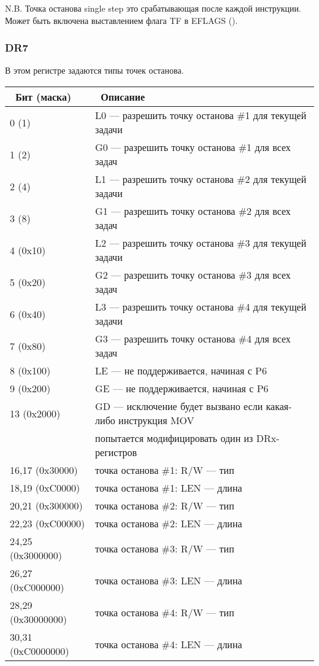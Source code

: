 N.B. Точка останова single step это срабатывающая после каждой инструкции.
Может быть включена выставлением флага TF в EFLAGS ().

\subsubsection{DR7}

В этом регистре задаются типы точек останова.

\begin{center}
\begin{tabular}{ | l | l | }
\hline
\headercolor\ Бит (маска) &
\headercolor\ Описание \\
\hline
0 (1)       &  L0 --- разрешить точку останова \#1 для текущей задачи \\
\hline
1 (2)       &  G0 --- разрешить точку останова \#1 для всех задач \\
\hline
2 (4)       &  L1 --- разрешить точку останова \#2 для текущей задачи \\
\hline
3 (8)       &  G1 --- разрешить точку останова \#2 для всех задач \\
\hline
4 (0x10)    &  L2 --- разрешить точку останова \#3 для текущей задачи \\
\hline
5 (0x20)    &  G2 --- разрешить точку останова \#3 для всех задач \\
\hline
6 (0x40)    &  L3 --- разрешить точку останова \#4 для текущей задачи \\
\hline
7 (0x80)    &  G3 --- разрешить точку останова \#4 для всех задач \\
\hline
8 (0x100)   &  LE --- не поддерживается, начиная с P6 \\
\hline
9 (0x200)   &  GE --- не поддерживается, начиная с P6 \\
\hline
13 (0x2000) &  GD --- исключение будет вызвано если какая-либо инструкция MOV \\
            & попытается модифицировать один из DRx-регистров \\
\hline
16,17 (0x30000)    &  точка останова \#1: R/W --- тип \\
\hline
18,19 (0xC0000)    &  точка останова \#1: LEN --- длина \\
\hline
20,21 (0x300000)   &  точка останова \#2: R/W --- тип \\
\hline
22,23 (0xC00000)   &  точка останова \#2: LEN --- длина \\
\hline
24,25 (0x3000000)  &  точка останова \#3: R/W --- тип \\
\hline
26,27 (0xC000000)  &  точка останова \#3: LEN --- длина \\
\hline
28,29 (0x30000000) &  точка останова \#4: R/W --- тип \\
\hline
30,31 (0xC0000000) &  точка останова \#4: LEN --- длина \\
\hline
\end{tabular}
\end{center}


